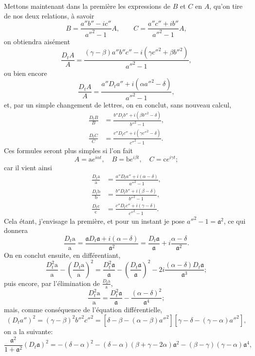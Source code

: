 \documentclass[11pt,leqno,oneside,letterpaper]{book}[2005/09/16]
\begin{document}
Mettons maintenant dans la premi\`ere les expressions de $B$ et $C$ en $A$,
qu'on tire de nos deux relations, \`a savoir
\[
  B=\frac{a''b'' - ic''}{a''^2-1}A, \qquad
  C=\frac{a''c'' + ib''}{a''^2-1}A,
\]
on obtiendra ais\'ement
\[
  \frac{D_t A}{A} =
  \frac{ (\gamma-\beta) a''b''c'' - i (\gamma c''^2 + \beta b''^2)}{a''^2 -1} ,
\]
ou bien encore
\[
  \frac{D_t A}{A} =
  \frac{a'' D_t a'' + i(\alpha a''^2 - \delta)}{a''^2 - 1},
\]
et, par un simple changement de lettres, on en conclut, sans nouveau
calcul,
\begin{align*}
  \frac{D_t B}{B} &=
  \frac{b'' D_t b'' + i(\beta b''^2 - \delta)}{b''^2 - 1}, \\
  \frac{D_t C}{C} &=
  \frac{c'' D_t c'' + i(\gamma c''^2 - \delta)}{c''^2 - 1}.
\end{align*}
Ces formules seront plus simples si l'on fait
\[
  A = \mathrm{a} e^{i\alpha t},\quad
  B = \mathrm{b} e^{i\beta  t},\quad
  C = \mathrm{c} e^{i\gamma t};
\]
car il vient ainsi
\begin{align*}
  \frac{D_t \mathrm{a}}{\mathrm{a}} &=
  \frac{a'' D_t a'' + i(\alpha - \delta)}{a''^2 - 1}, \\
  \frac{D_t \mathrm{b}}{\mathrm{b}} &=
  \frac{b'' D_t b'' + i(\beta  - \delta)}{b''^2 - 1}, \\
  \frac{D_t \mathrm{c}}{\mathrm{c}} &=
  \frac{c'' D_t c'' + i(\gamma - \delta)}{c''^2 - 1}.
\end{align*}
Cela \'etant, j'envisage la premi\`ere, et pour un instant je pose $a''^2 -1 = \mathfrak{a}^2$,
ce qui donnera
\[
  \frac{D_t \mathrm{a}}{\mathrm{a}}
  =
  \frac{\mathfrak{a} D_t \mathfrak{a} + i (\alpha-\delta)}{\mathfrak{a}^2}
  =
  \frac{D_t \mathfrak{a}}{\mathfrak{a}} + i \frac{\alpha-\delta}{\mathfrak{a}^2} .
\]
On en conclut ensuite, en diff\'erentiant,
\[
  \frac{D_t^2 \mathrm{a}}{\mathrm{a}} - \left( \frac{D_t\mathrm{a}}{\mathrm{a}} \right)^2
  =
  \frac{D_t^2 \mathfrak{a}}{\mathfrak{a}} - \left( \frac{D_t\mathfrak{a}}{\mathfrak{a}} \right)^2
  - 2i \frac{(\alpha-\delta) D_t\mathfrak{a}}{\mathfrak{a}^{3}};
\]
puis encore, par l'\'elimination de $\frac{D_t\mathrm{a}}{\mathrm{a}}$,
\[
  \frac{D_t^2\mathrm{a}}{\mathrm{a}} =
  \frac{D_t^2\mathfrak{a}}{\mathfrak{a}} - \frac{(\alpha-\delta)^2}{\mathfrak{a}^{4}};
\]
mais, comme cons\'equence de l'\'equation diff\'erentielle,
\[
(D_t a'')^2 = (\gamma-\beta)^2 b''^2c''^2
= \left[ \delta - \beta  - (\alpha-\beta )a''^2 \right]
\left[ \gamma - \delta - (\gamma-\alpha)a''^2 \right],
\]
on a la suivante:
\[
  \frac{\mathfrak{a}^2}{1+\mathfrak{a}^2} (D_t\mathfrak{a})^2
= - (\delta-\alpha)^2
  - (\delta-\alpha)(\beta+\gamma-2\alpha)\mathfrak{a}^2
  - (\beta-\gamma)(\gamma-\alpha)\mathfrak{a}^4,
\]
\end{document}
